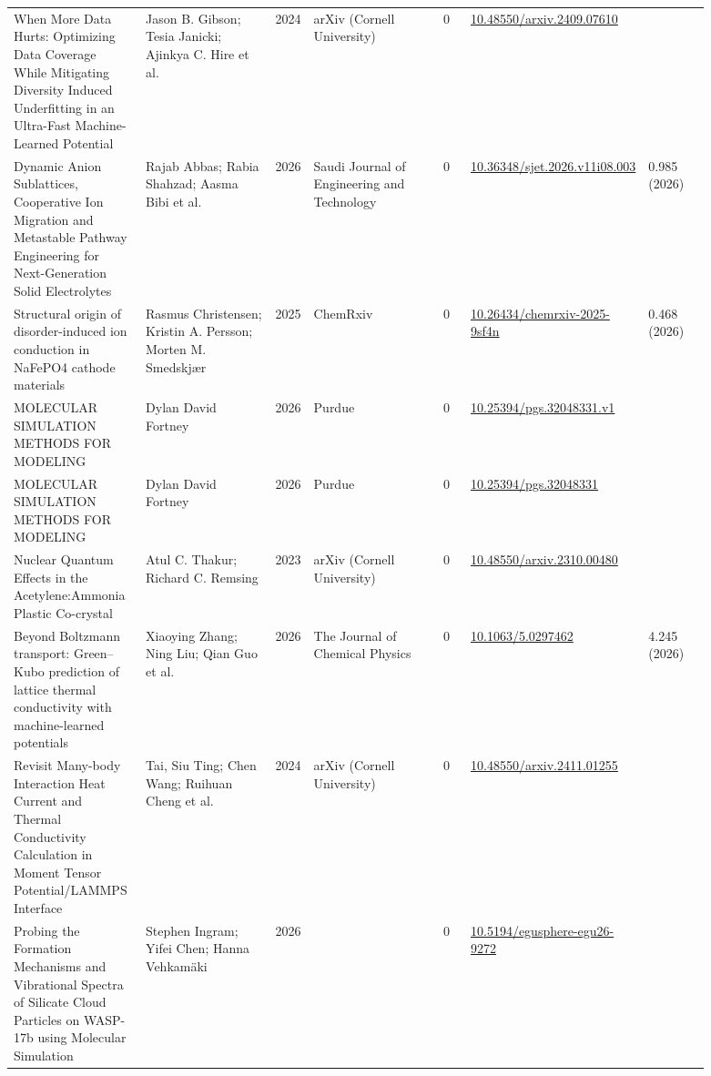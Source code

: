 \documentclass[10pt,a4paper]{article}
\begin{document}
{\begin{longtable}{p{0.192\linewidth}p{0.192\linewidth}p{0.043\linewidth}p{0.192\linewidth}p{0.043\linewidth}p{0.132\linewidth}p{0.096\linewidth}}
When More Data Hurts: Optimizing Data Coverage While Mitigating Diversity Induced Underfitting in an Ultra-Fast Machine-Learned Potential & Jason B. Gibson; Tesia Janicki; Ajinkya C. Hire et al. & 2024 & arXiv (Cornell University) & 0 & \href{https://doi.org/10.48550/arxiv.2409.07610}{10.48550/arxiv.2409.07610} &  \\
Dynamic Anion Sublattices, Cooperative Ion Migration and Metastable Pathway Engineering for Next-Generation Solid Electrolytes & Rajab Abbas; Rabia Shahzad; Aasma Bibi et al. & 2026 & Saudi Journal of Engineering and Technology & 0 & \href{https://doi.org/10.36348/sjet.2026.v11i08.003}{10.36348/sjet.2026.v11i08.003} & 0.985 (2026) \\
Structural origin of disorder-induced ion conduction in NaFePO4 cathode materials & Rasmus Christensen; Kristin A. Persson; Morten M. Smedskjær & 2025 & ChemRxiv & 0 & \href{https://doi.org/10.26434/chemrxiv-2025-9sf4n}{10.26434/chemrxiv-2025-9sf4n} & 0.468 (2026) \\
MOLECULAR SIMULATION METHODS FOR MODELING & Dylan David Fortney & 2026 & Purdue & 0 & \href{https://doi.org/10.25394/pgs.32048331.v1}{10.25394/pgs.32048331.v1} &  \\
MOLECULAR SIMULATION METHODS FOR MODELING & Dylan David Fortney & 2026 & Purdue & 0 & \href{https://doi.org/10.25394/pgs.32048331}{10.25394/pgs.32048331} &  \\
Nuclear Quantum Effects in the Acetylene:Ammonia Plastic Co-crystal & Atul C. Thakur; Richard C. Remsing & 2023 & arXiv (Cornell University) & 0 & \href{https://doi.org/10.48550/arxiv.2310.00480}{10.48550/arxiv.2310.00480} &  \\
Beyond Boltzmann transport: Green–Kubo prediction of lattice thermal conductivity with machine-learned potentials & Xiaoying Zhang; Ning Liu; Qian Guo et al. & 2026 & The Journal of Chemical Physics & 0 & \href{https://doi.org/10.1063/5.0297462}{10.1063/5.0297462} & 4.245 (2026) \\
Revisit Many-body Interaction Heat Current and Thermal Conductivity Calculation in Moment Tensor Potential/LAMMPS Interface & Tai, Siu Ting; Chen Wang; Ruihuan Cheng et al. & 2024 & arXiv (Cornell University) & 0 & \href{https://doi.org/10.48550/arxiv.2411.01255}{10.48550/arxiv.2411.01255} &  \\
Probing the Formation Mechanisms and Vibrational Spectra of Silicate Cloud Particles on WASP-17b using Molecular Simulation & Stephen Ingram; Yifei Chen; Hanna Vehkamäki & 2026 &  & 0 & \href{https://doi.org/10.5194/egusphere-egu26-9272}{10.5194/egusphere-egu26-9272} &  \\

\end{longtable}}
\end{document}

